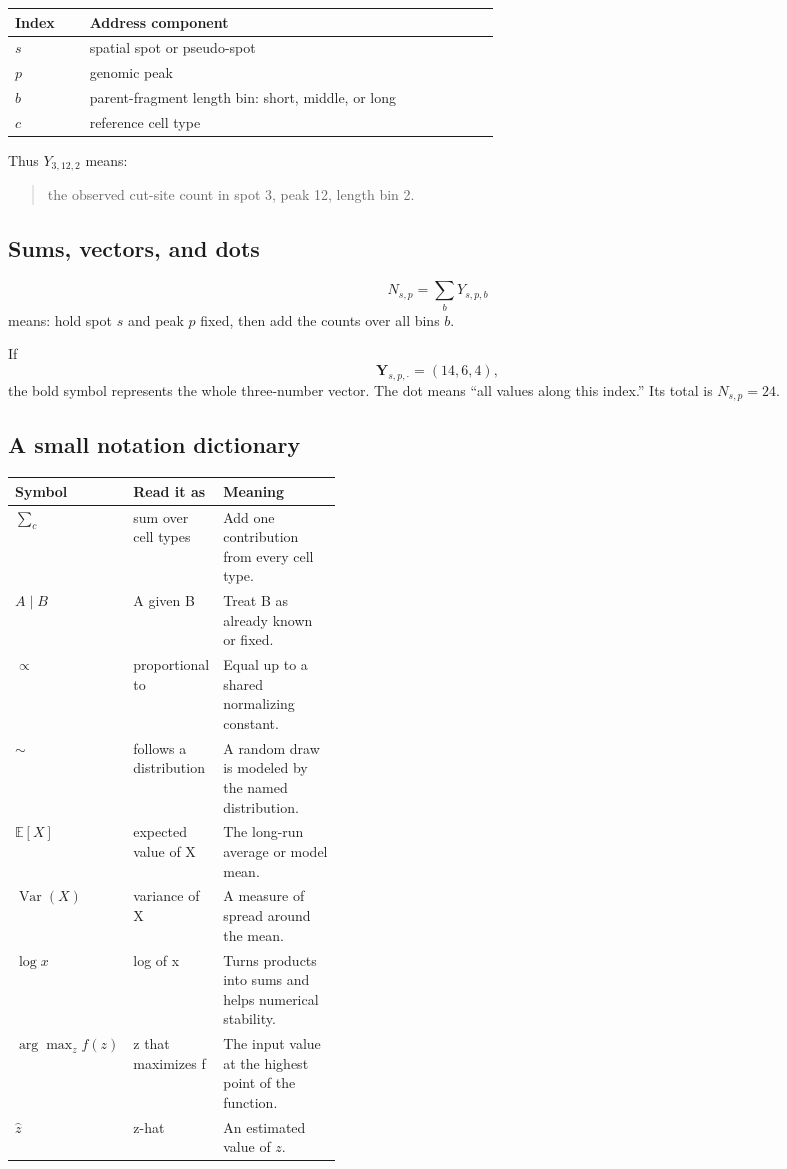 \documentclass[11pt]{article}
\newcommand{\E}{\mathbb{E}}
\newcommand{\Var}{\operatorname{Var}}
\begin{document}
\begin{center}
\begin{tabular}{C{0.12\linewidth}L{0.66\linewidth}}
\toprule
Index & Address component \\
\midrule
\(s\) & spatial spot or pseudo-spot \\
\(p\) & genomic peak \\
\(b\) & parent-fragment length bin: short, middle, or long \\
\(c\) & reference cell type \\
\bottomrule
\end{tabular}
\end{center}

Thus \(Y_{3,12,2}\) means:

\begin{quote}
the observed cut-site count in spot 3, peak 12, length bin 2.
\end{quote}

\subsection{Sums, vectors, and dots}

\[
N_{s,p}=\sum_bY_{s,p,b}
\]
means: hold spot \(s\) and peak \(p\) fixed, then add the counts over all bins
\(b\).

If
\[
\boldsymbol{Y}_{s,p,\boldsymbol{\cdot}}=(14,6,4),
\]
the bold symbol represents the whole three-number vector. The dot means “all
values along this index.” Its total is \(N_{s,p}=24\).

\subsection{A small notation dictionary}

\begin{center}
\begin{tabularx}{0.96\linewidth}{C{0.13\linewidth}L{0.25\linewidth}X}
\toprule
Symbol & Read it as & Meaning \\
\midrule
\(\sum_c\) & sum over cell types & Add one contribution from every cell type. \\
\(A\mid B\) & A given B & Treat B as already known or fixed. \\
\(\propto\) & proportional to & Equal up to a shared normalizing constant. \\
\(\sim\) & follows a distribution & A random draw is modeled by the named distribution. \\
\(\E[X]\) & expected value of X & The long-run average or model mean. \\
\(\Var(X)\) & variance of X & A measure of spread around the mean. \\
\(\log x\) & log of x & Turns products into sums and helps numerical stability. \\
\(\arg\max_z f(z)\) & z that maximizes f & The input value at the highest point of the function. \\
\(\widehat z\) & z-hat & An estimated value of \(z\). \\
\bottomrule
\end{tabularx}
\end{center}
\end{document}
